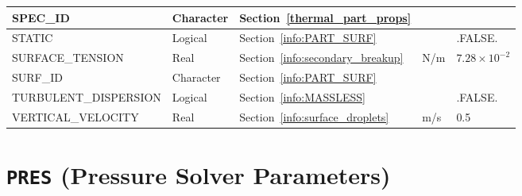 \documentclass[11pt]{book}
\begin{document}
\begin{longtable}{@{\extracolsep{\fill}}|l|l|l|l|l|}
{\ct SPEC\_ID}                           & Character       & Section~\ref{thermal_part_props}        &           &               \\ \hline
{\ct STATIC}                             & Logical         & Section~\ref{info:PART_SURF}            &           & {\ct .FALSE.} \\ \hline
{\ct SURFACE\_TENSION}                   & Real            & Section~\ref{info:secondary_breakup}    & N/m       & $7.28 \times 10^{-2}$  \\ \hline
{\ct SURF\_ID}                           & Character       & Section~\ref{info:PART_SURF}            &           &               \\ \hline
{\ct TURBULENT\_DISPERSION}              & Logical         & Section~\ref{info:MASSLESS}             &           & {\ct .FALSE.} \\ \hline
{\ct VERTICAL\_VELOCITY}                 & Real            & Section~\ref{info:surface_droplets}     & m/s       &  0.5          \\ \hline
\end{longtable}

\vspace{\baselineskip}

\section{\texorpdfstring{{\tt PRES}}{PRES} (Pressure Solver Parameters)}
\end{document}
